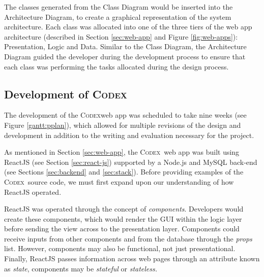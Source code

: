 \documentclass[final]{cmpreport}
\newcommand{\Codex}{\textsc{Codex}}
\begin{document}
		The classes generated from the Class Diagram would be inserted into the Architecture Diagram, to create a graphical representation of the system architecture. Each class was allocated into one of the three tiers of the web app architecture (described in Section \ref{sec:web-app} and Figure \ref{fig:web-apps}): Presentation, Logic and Data. Similar to the Class Diagram, the Architecture Diagram guided the developer during the development process to ensure that each class was performing the tasks allocated during the design process. 
		
		\subsection{Development of \Codex} \label{sec:codex-development}
		The development of the \Codex web app was scheduled to take nine weeks (see Figure \ref{gantt:pplan}), which allowed for multiple revisions of the design and development in addition to the writing and evaluation necessary for the project. 
		
		As mentioned in Section \ref{sec:web-app}, the \Codex \ web app was built using ReactJS (see Section \ref{sec:react-js}) supported by a Node.js and MySQL back-end (see Sections \ref{sec:backend} and \ref{sec:stack}). Before providing examples of the \Codex \ source code, we must first expand upon our understanding of how ReactJS operated.
		
		ReactJS was operated through the concept of \emph{components}. Developers would create these components, which would render the GUI within the logic layer before sending the view across to the presentation layer. Components could receive inputs from other components and from the database through the \emph{props} list. However, components may also be functional, not just presentational. Finally, ReactJS passes information across web pages through an attribute known as \emph{state}, components may be \emph{stateful} or \emph{stateless.}
		
\end{document}
